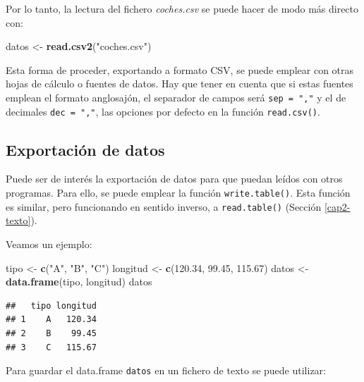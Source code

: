 \documentclass[
]{book}
\newenvironment{Shaded}{\begin{snugshade}}{\end{snugshade}}
\newcommand{\FloatTok}[1]{\textcolor[rgb]{0.00,0.00,0.81}{#1}}
\newcommand{\FunctionTok}[1]{\textcolor[rgb]{0.13,0.29,0.53}{\textbf{#1}}}
\newcommand{\NormalTok}[1]{#1}
\newcommand{\OtherTok}[1]{\textcolor[rgb]{0.56,0.35,0.01}{#1}}
\newcommand{\StringTok}[1]{\textcolor[rgb]{0.31,0.60,0.02}{#1}}
\begin{document}
Por lo tanto, la lectura del fichero \emph{coches.csv} se puede hacer de modo
más directo con:

\begin{Shaded}
\begin{Highlighting}[]
\NormalTok{datos }\OtherTok{\textless{}{-}} \FunctionTok{read.csv2}\NormalTok{(}\StringTok{"coches.csv"}\NormalTok{)}
\end{Highlighting}
\end{Shaded}

Esta forma de proceder, exportando a formato CSV, se puede emplear con otras hojas de cálculo o fuentes de datos.
Hay que tener en cuenta que si estas fuentes emplean el formato anglosajón, el separador de campos será \texttt{sep\ =\ ","} y el de decimales \texttt{dec\ =\ ","}, las opciones por defecto en la función \texttt{read.csv()}.

\subsection{Exportación de datos}\label{exportaciuxf3n-de-datos}

Puede ser de interés la
exportación de datos para que puedan leídos con otros programas. Para
ello, se puede emplear la función \texttt{write.table()}. Esta función es
similar, pero funcionando en sentido inverso, a \texttt{read.table()}
(Sección \ref{cap2-texto}).

Veamos un ejemplo:

\begin{Shaded}
\begin{Highlighting}[]
\NormalTok{tipo }\OtherTok{\textless{}{-}} \FunctionTok{c}\NormalTok{(}\StringTok{"A"}\NormalTok{, }\StringTok{"B"}\NormalTok{, }\StringTok{"C"}\NormalTok{)}
\NormalTok{longitud }\OtherTok{\textless{}{-}} \FunctionTok{c}\NormalTok{(}\FloatTok{120.34}\NormalTok{, }\FloatTok{99.45}\NormalTok{, }\FloatTok{115.67}\NormalTok{)}
\NormalTok{datos }\OtherTok{\textless{}{-}} \FunctionTok{data.frame}\NormalTok{(tipo, longitud)}
\NormalTok{datos}
\end{Highlighting}
\end{Shaded}

\begin{verbatim}
##   tipo longitud
## 1    A   120.34
## 2    B    99.45
## 3    C   115.67
\end{verbatim}

Para guardar el data.frame \texttt{datos} en un fichero de texto se
puede utilizar:
\end{document}
